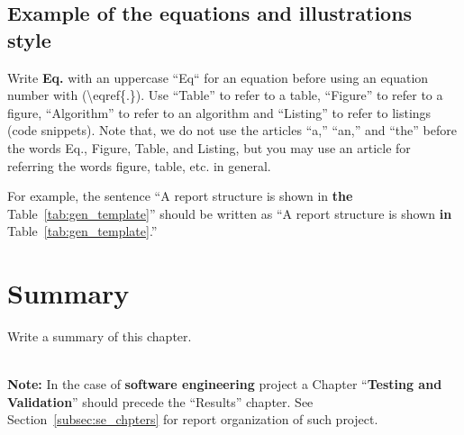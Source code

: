 \subsection{Example of the equations and illustrations style}
Write \textbf{Eq.} with an uppercase ``Eq`` for an equation before using an equation number with (\textbackslash eqref\{.\}). Use ``Table'' to refer to a table, ``Figure'' to refer to a figure, ``Algorithm'' to refer to an algorithm and ``Listing'' to refer to listings (code snippets). Note that, we do not use the articles ``a,'' ``an,'' and ``the'' before the words Eq., Figure, Table, and Listing, but you may use an article for referring the words figure, table, etc. in general.

For example, the sentence ``A report structure is shown in \textbf{the} Table~\ref{tab:gen_template}'' should be written as ``A report structure is shown \textbf{in} Table~\ref{tab:gen_template}.'' 
 

\section{Summary}
Write a summary of this chapter.

~\\[5em]
\noindent
{\huge\textbf{Note:}} In the case of \textbf{software engineering} project a Chapter ``\textbf{Testing and Validation}'' should precede the ``Results'' chapter. See Section~\ref{subsec:se_chpters} for report organization of such project. 

